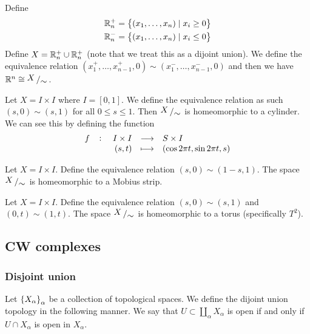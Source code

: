 \documentclass[11pt,a4paper]{article}
\begin{document}
\begin{example}
  Define
  \begin{align*}
    \mathbb{R}_n^+ &= \set{(x_1,\dots,x_n) \mid x_i \geq 0 } \\
    \mathbb{R}_n^- &= \set{(x_1,\dots,x_n) \mid x_i \le 0 }
  \end{align*}
  Define $X = \mathbb{R}_n^+ \cup \mathbb{R}_n^+$ (note that we treat this as a dijoint union).
  We define the equivalence relation 
  $(x_1^+,\dots,x_{n-1}^+, 0) \sim (x_1^-,\dots,x_{n-1}^-,0)$
  and then we have $\R^n \cong \bigslant{X}{\sim}$.
\end{example}

\begin{example}
  Let $X = I \times I$ where $I = [0,1]$.
  We define the equivalence relation as such $(s,0) \sim (s,1)$ for all
  $0 \le s \le 1$.
  Then $\bigslant{X}{\sim}$ is homeomorphic to a cylinder.
  We can see this by defining the function
  \[
    \fullfunction{f}{I \times I}{S \times I}
    {(s,t)}{(\cos 2 \pi t, \sin 2 \pi t, s)}
  \]
\end{example}

\begin{example}
  Let $X = I \times I$.
  Define the equivalence relation $(s, 0) \sim (1 - s, 1)$.
  The space $\bigslant{X}{\sim}$ is homeomorphic to a Mobius strip.
\end{example}

\begin{example}
  Let $X = I \times I$.
  Define the equivalence relation $(s, 0) \sim (s, 1)$ and 
  $(0, t) \sim (1, t)$.
  The space $\bigslant{X}{\sim}$ is homeomorphic to a torus (specifically
  $T^2$).
\end{example}

\subsection{CW complexes}

\subsubsection{Disjoint union}

\begin{definition}
  Let $\set{X_{\alpha}}_{\alpha}$ be a collection of topological spaces.
  We define the dijoint union topology in the following manner.
  We say that $U \subset \coprod_{\alpha} X_{\alpha}$ is open if and only
  if $U \cap X_{\alpha}$ is open in $X_{\alpha}$.
\end{definition}
\end{document}
